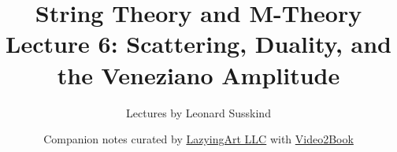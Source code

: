 \documentclass[11pt,oneside]{book}
\begin{document}
\hypersetup{pageanchor=false}
\frontmatter
\title{String Theory and M-Theory\\[0.45em]
\large Lecture 6: Scattering, Duality, and the Veneziano Amplitude}
\author{Lectures by Leonard Susskind}
\date{Companion notes curated by
\href{https://lazying.art}{LazyingArt LLC} with
\href{https://github.com/lachlanchen/Video2Book}{Video2Book}}
\maketitle
\clearpage
\hypersetup{pageanchor=true}
\mainmatter

\end{document}
